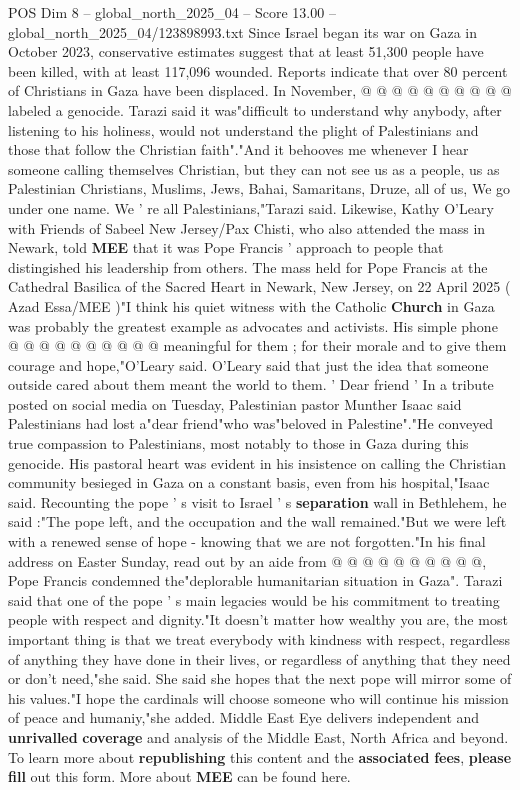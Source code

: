 \begin{textsample}{POS Dim 8 – global\_north\_2025\_04 – Score 13.00 – global\_north\_2025\_04/123898993.txt}
Since Israel began its war on Gaza in October 2023, conservative estimates suggest that at least 51,300 people have been killed, with at least 117,096 wounded.
Reports indicate that over 80 percent of Christians in Gaza have been displaced.
In November, @ @ @ @ @ @ @ @ @ @ labeled a genocide.
Tarazi said it was"difficult to understand why anybody, after listening to his holiness, would not understand the plight of Palestinians and those that follow the Christian faith"."And it behooves me whenever I hear someone calling themselves Christian, but they can not see us as a people, us as Palestinian Christians, Muslims, Jews, Bahai, Samaritans, Druze, all of us, We go under one name.
We ' re all Palestinians,"Tarazi said.
Likewise, Kathy O'Leary with Friends of Sabeel New Jersey/Pax Chisti, who also attended the mass in Newark, told \textbf{MEE} that it was Pope Francis ' approach to people that distingished his leadership from others.
The mass held for Pope Francis at the Cathedral Basilica of the Sacred Heart in Newark, New Jersey, on 22 April 2025 ( Azad Essa/MEE )"I think his quiet witness with the Catholic \textbf{Church} in Gaza was probably the greatest example as advocates and activists.
His simple phone @ @ @ @ @ @ @ @ @ @ meaningful for them ; for their morale and to give them courage and hope,"O'Leary said.
O'Leary said that just the idea that someone outside cared about them meant the world to them. ' Dear friend ' In a tribute posted on social media on Tuesday, Palestinian pastor Munther Isaac said Palestinians had lost a"dear friend"who was"beloved in Palestine"."He conveyed true compassion to Palestinians, most notably to those in Gaza during this genocide.
His pastoral heart was evident in his insistence on calling the Christian community besieged in Gaza on a constant basis, even from his hospital,"Isaac said.
Recounting the pope ' s visit to Israel ' s \textbf{separation} wall in Bethlehem, he said :"The pope left, and the occupation and the wall remained."But we were left with a renewed sense of hope - knowing that we are not forgotten."In his final address on Easter Sunday, read out by an aide from @ @ @ @ @ @ @ @ @ @, Pope Francis condemned the"deplorable humanitarian situation in Gaza".
Tarazi said that one of the pope ' s main legacies would be his commitment to treating people with respect and dignity."It doesn't matter how wealthy you are, the most important thing is that we treat everybody with kindness with respect, regardless of anything they have done in their lives, or regardless of anything that they need or don't need,"she said.
She said she hopes that the next pope will mirror some of his values."I hope the cardinals will choose someone who will continue his mission of peace and humaniy,"she added.
Middle East Eye delivers independent and \textbf{unrivalled} \textbf{coverage} and analysis of the Middle East, North Africa and beyond.
To learn more about \textbf{republishing} this content and the \textbf{associated} \textbf{fees}, \textbf{please} \textbf{fill} out this form.
More about \textbf{MEE} can be found here.

\end{textsample}
